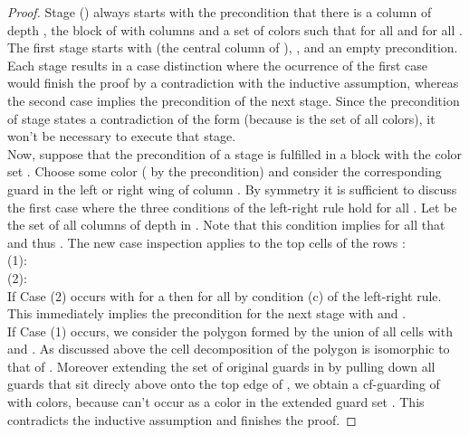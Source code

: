\documentclass[a4paper,USenglish,numberwithinsect]{lipics}
\theoremstyle{plain}
\begin{document}
\begin{proof}
Stage  ()  always starts with the precondition that 
there is a column  of depth ,
the block  of  with  
columns and a set  of  colors such that 
 for all  and for  all .
The first stage starts with  (the central column of ),
,  and an empty precondition.
Each stage results in a case distinction where the ocurrence of the first case
would finish the proof by a contradiction with the inductive assumption,
whereas the second case implies  the precondition of the next stage.
Since the precondition of  stage  states a contradiction of the form  
(because  is the set of all colors), it  won't be necessary to execute that stage. 
\\
Now, suppose that the precondition of a stage  is fulfilled in a block 
with the color set . Choose some color
 ( by the  precondition)
and consider  the corresponding guard  in the left or 
right wing of column . By symmetry it is sufficient to discuss the 
first case  where the three conditions of the left-right rule
hold for all . Let  be the 
set of all columns of depth  in  . Note that this condition implies
for all  that  and thus .
The new case inspection applies to the top cells of the rows : 
\\
  (1): \\
  (2): \\
If Case (2) occurs with  for a  then  for all 
by condition (c) of the left-right rule. This immediately implies the precondition for the next
stage with  and . \\
If Case (1) occurs, we consider the polygon  formed by the union of all cells
 with  and . 
As discussed above the cell decomposition of the polygon  is isomorphic to that
of . Moreover extending the set  of original guards in 
by pulling down all guards that sit direcly above   onto the top edge of 
, we obtain a cf-guarding of  with   colors, because 
  can't occur as a color in the extended guard set .
This contradicts the inductive assumption and finishes the proof.   
\end{proof}
\end{document}
